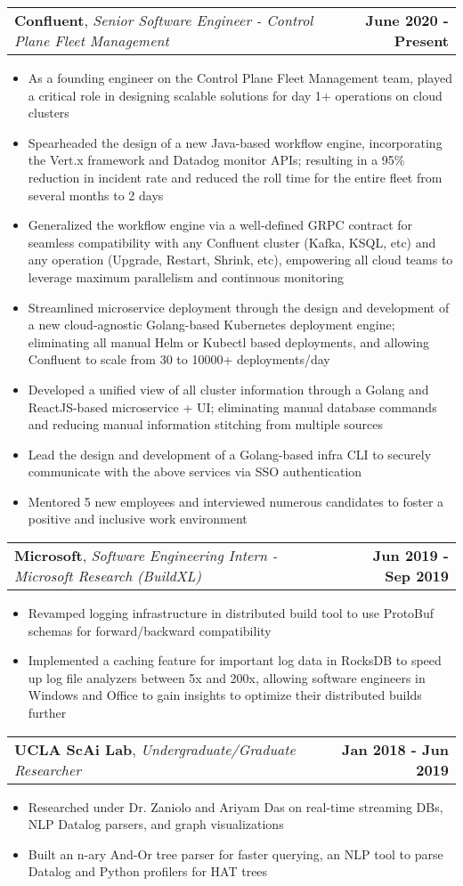 \documentclass[letterpaper,10.8pt]{article}
\makeatletter
\newcommand{\resumeItemOne}[1]{
  \item[$\circ$]\small{{#1 \vspace{-2pt}}
  }
}
\newcommand{\resumeSubheading}[3]{
  \vspace{-2pt}\item[$ $]
    \begin{tabular*}{0.97\textwidth}{l@{\extracolsep{\fill}}r}
      \textbf{#1}, \textit{\small #2} & \textbf{\small #3} \\
    \end{tabular*}
  \vspace{-7pt}
}
\newcommand{\resumeItemListStart}{\begin{itemize}}
\newcommand{\resumeItemListEnd}{\end{itemize}\vspace{-5pt}}
\makeatother
\begin{document}
    \resumeSubheading
    {Confluent}{Senior Software Engineer - Control Plane Fleet Management}{June 2020 - Present}
    \resumeItemListStart
        \resumeItemOne{As a founding engineer on the Control Plane Fleet Management team, played a critical role in designing scalable solutions for day 1+ operations on cloud clusters}
        \resumeItemOne{Spearheaded the design of a new Java-based workflow engine, incorporating the Vert.x framework and Datadog monitor APIs; resulting in a 95\% reduction in incident rate and reduced the roll time for the entire fleet from several months to 2 days}
        \resumeItemOne{Generalized the workflow engine via a well-defined GRPC contract for seamless compatibility with any Confluent cluster (Kafka, KSQL, etc) and any operation (Upgrade, Restart, Shrink, etc), empowering all cloud teams to leverage maximum parallelism and continuous monitoring}
        \resumeItemOne{Streamlined microservice deployment through the design and development of a new cloud-agnostic Golang-based Kubernetes deployment engine; eliminating all manual Helm or Kubectl based deployments, and allowing Confluent to scale from 30 to 10000+ deployments/day}
        \resumeItemOne{Developed a unified view of all cluster information through a Golang and ReactJS-based microservice + UI; eliminating manual database commands and reducing manual information stitching from multiple sources}
        \resumeItemOne{Lead the design and development of a Golang-based infra CLI to securely communicate with the above services via SSO authentication}
        \resumeItemOne{Mentored 5 new employees and interviewed numerous candidates to foster a positive and inclusive work environment}
    \resumeItemListEnd

    \resumeSubheading
    {Microsoft}{Software Engineering Intern - Microsoft Research (BuildXL)}{Jun 2019 - Sep 2019}
    \resumeItemListStart
        \resumeItemOne{Revamped logging infrastructure in distributed build tool to use ProtoBuf schemas for forward/backward compatibility}
        \resumeItemOne{Implemented a caching feature for important log data in RocksDB to speed up log file analyzers between 5x and 200x, allowing software engineers in Windows and Office to gain insights to optimize their distributed builds further}
    \resumeItemListEnd
    
    \resumeSubheading
    {UCLA ScAi Lab}{Undergraduate/Graduate Researcher}{Jan 2018 - Jun 2019}
    \resumeItemListStart
        \resumeItemOne{Researched under Dr. Zaniolo and Ariyam Das on real-time streaming DBs, NLP Datalog parsers, and
        graph visualizations}
        \resumeItemOne{Built an n-ary And-Or tree parser for faster querying, an NLP tool to parse Datalog and Python profilers for HAT trees}
    \resumeItemListEnd
\end{document}
